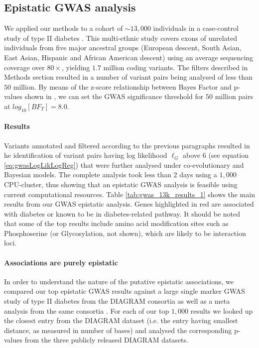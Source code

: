 \subsection{Epistatic GWAS analysis}

We applied our methods to a cohort of $\sim 13,000$ individuals in a case-control study of type II diabetes \cite{mccarthy2015T2D}.
This multi-ethnic study covers exons of unrelated individuals from five major ancestral groups (European descent, South Asian, East Asian, Hispanic and African American descent) using an average sequencing coverage over $80 \times$, yielding $1.7$ million coding variants. 
The filters described in Methods section resulted in a number of variant pairs being analysed of less than $50$ million. 
By means of the z-score relationship between Bayes Factor and p-values shown in \cite{goodman1999toward}, we can set the GWAS significance threshold for $50$ million pairs at $log_{10}[BF_T] =  8.0$.

\paragraph{Results}
Variants annotated and filtered according to the previous paragraphs resulted in he identification of variant pairs having log likelihood $\ell_G$ above $6$ (see equation \ref{eq:gwasLogLikLogReg}) that were further analysed under co-evolutionary and Bayesian models. 
The complete analysis took less than $2$ days using a $1,000$ CPU-cluster, thus showing that an epistatic GWAS analysis is feasible using current computational resources. 
Table \ref{tab:gwas_13k_results_1} shows the main results from our GWAS epistatic analysis.
Genes highlighted in red are associated with diabetes or known to be in diabetes-related pathway. 
It should be noted that some of the top results include amino acid modification sites such as Phosphoserine (or Glycosylation, not shown), which are likely to be interaction loci.

\paragraph{Associations are purely epistatic}
In order to understand the nature of the putative epistatic associations, we compared our top epistatic GWAS results against a large single marker GWAS study of type II diabetes from the DIAGRAM consortia \cite{zeggini2008meta,voight2010twelve} as well as a meta analysis from the same consortia \cite{morris2012large}.
For each of our top $1,000$ results we looked up the closest entry from the DIAGRAM dataset (i.e. the entry having smallest distance, as measured in number of bases) and analysed the corresponding p-values from the three publicly released DIAGRAM datasets.

